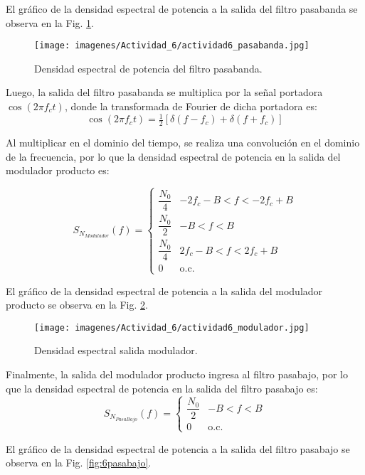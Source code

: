 	El gráfico de la densidad espectral de potencia a la salida del filtro pasabanda se observa en la Fig. \ref{fig:6pasabanda}.

		\begin{figure}[H]
			\centering
			\texttt{[image: imagenes/Actividad\_6/actividad6\_pasabanda.jpg]}
			\caption{Densidad espectral de potencia del filtro pasabanda.}
			\label{fig:6pasabanda}
		\end{figure}


	Luego, la salida del filtro pasabanda se multiplica por la señal portadora $\cos(2 \pi f_c t)$, donde la transformada de 
	Fourier de dicha portadora es:
		\[
			\cos(2 \pi f_c t) = \tfrac{1}{2} \left[ \delta(f - f_c) + \delta(f + f_c) \right]
		\]
	
	Al multiplicar en el dominio del tiempo, se realiza una convolución en el dominio de la frecuencia, por lo que la densidad espectral de potencia en la 
	salida del modulador producto es:

		\[
			S_{N_{Modulador}}(f) =
			\begin{cases}
			\dfrac{N_0}{4} & -2f_c - B < f < -2f_c + B \\[6pt]
			\dfrac{N_0}{2} & -B < f < B \\[6pt]
			\dfrac{N_0}{4} & 2f_c - B < f < 2f_c + B \\[6pt]
			0 & \text{o.c.}
			\end{cases}
		\]
	
	El gráfico de la densidad espectral de potencia a la salida del modulador producto se observa en la Fig. \ref{fig:6modulador}.


		\begin{figure}[H]
			\centering
			\texttt{[image: imagenes/Actividad\_6/actividad6\_modulador.jpg]}
			\caption{Densidad espectral salida modulador.}
			\label{fig:6modulador}
		\end{figure}



	Finalmente, la salida del modulador producto ingresa al filtro pasabajo, por lo que la densidad espectral de potencia en 
	la salida del filtro pasabajo es:
		\[
				S_{N_{PasaBajo}}(f) =
				\begin{cases}
				\dfrac{N_0}{2} & -B < f < B \\[6pt]
				0 & \text{o.c.}
				\end{cases}
		\]

	El gráfico de la densidad espectral de potencia a la salida del filtro pasabajo se observa en la Fig. \ref{fig:6pasabajo}.
    
